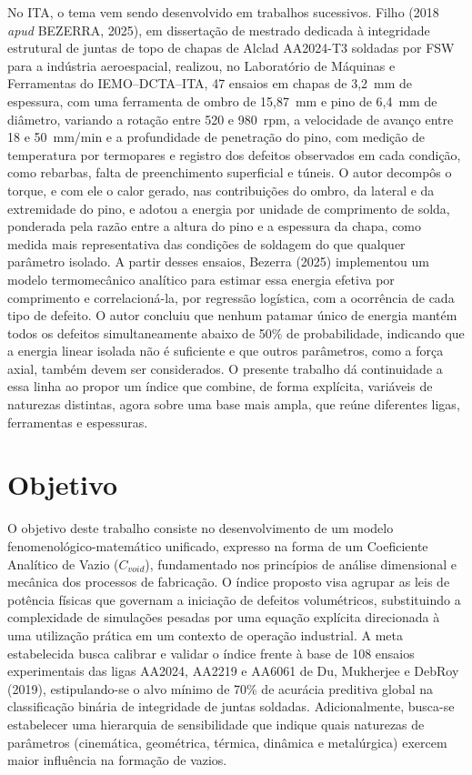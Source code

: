 \documentclass[12pt,openany]{report}
\begin{document}
No ITA, o tema vem sendo desenvolvido em trabalhos sucessivos. Filho (2018 \textit{apud} BEZERRA, 2025), em dissertação de mestrado dedicada à integridade estrutural de juntas de topo de chapas de Alclad AA2024-T3 soldadas por FSW para a indústria aeroespacial, realizou, no Laboratório de Máquinas e Ferramentas do IEMO--DCTA--ITA, 47 ensaios em chapas de 3,2~mm de espessura, com uma ferramenta de ombro de 15,87~mm e pino de 6,4~mm de diâmetro, variando a rotação entre 520 e 980~rpm, a velocidade de avanço entre 18 e 50~mm/min e a profundidade de penetração do pino, com medição de temperatura por termopares e registro dos defeitos observados em cada condição, como rebarbas, falta de preenchimento superficial e túneis. O autor decompôs o torque, e com ele o calor gerado, nas contribuições do ombro, da lateral e da extremidade do pino, e adotou a energia por unidade de comprimento de solda, ponderada pela razão entre a altura do pino e a espessura da chapa, como medida mais representativa das condições de soldagem do que qualquer parâmetro isolado. A partir desses ensaios, Bezerra (2025) implementou um modelo termomecânico analítico para estimar essa energia efetiva por comprimento e correlacioná-la, por regressão logística, com a ocorrência de cada tipo de defeito. O autor concluiu que nenhum patamar único de energia mantém todos os defeitos simultaneamente abaixo de 50\% de probabilidade, indicando que a energia linear isolada não é suficiente e que outros parâmetros, como a força axial, também devem ser considerados. O presente trabalho dá continuidade a essa linha ao propor um índice que combine, de forma explícita, variáveis de naturezas distintas, agora sobre uma base mais ampla, que reúne diferentes ligas, ferramentas e espessuras.

\section{Objetivo}

O objetivo deste trabalho consiste no desenvolvimento de um modelo fenomenológico-matemático unificado, expresso na forma de um Coeficiente Analítico de Vazio ($C_{void}$), fundamentado nos princípios de análise dimensional e mecânica dos processos de fabricação. O índice proposto visa agrupar as leis de potência físicas que governam a iniciação de defeitos volumétricos, substituindo a complexidade de simulações pesadas por uma equação explícita direcionada à uma utilização prática em um contexto de operação industrial. A meta estabelecida busca calibrar e validar o índice frente à base de 108 ensaios experimentais das ligas AA2024, AA2219 e AA6061 de Du, Mukherjee e DebRoy (2019), estipulando-se o alvo mínimo de 70\% de acurácia preditiva global na classificação binária de integridade de juntas soldadas. Adicionalmente, busca-se estabelecer uma hierarquia de sensibilidade que indique quais naturezas de parâmetros (cinemática, geométrica, térmica, dinâmica e metalúrgica) exercem maior influência na formação de vazios.
\end{document}
